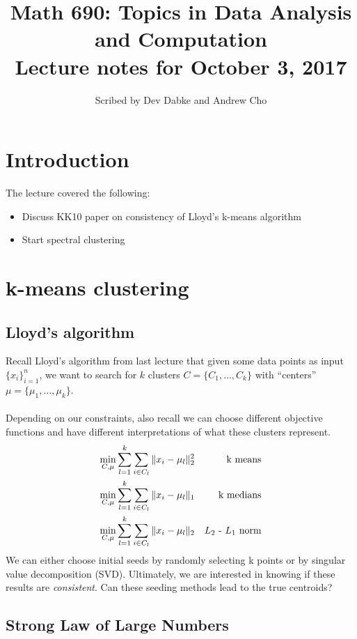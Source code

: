 \documentclass[12pt]{article}
\title{Math 690: Topics in Data Analysis and Computation \\
Lecture notes for October 3, 2017}
\date{}
\author{Scribed by Dev Dabke and Andrew Cho}
\theoremstyle{plain}
\begin{document}
\maketitle

\section{Introduction}
The lecture covered the following:
\begin{itemize}
	\item Discuss KK10 paper on consistency of Lloyd's k-means algorithm
	\item Start spectral clustering
\end{itemize}

\section{k-means clustering}
\label{sec:kmeans}

\subsection{Lloyd's algorithm}
\label{subsec: lloyd}

Recall Lloyd's algorithm from last lecture that given some data points as input $ \{ x_i \}^n_{i = 1} $, we want to search for $ k $ clusters $ C = \{ C_1, \ldots, C_k \} $ with ``centers'' $ \mu = \{ \mu_1, \ldots, \mu_k \} $.
\\ \\
Depending on our constraints, also recall we can choose different objective functions and have different interpretations of what these clusters represent.
\begin{align*}
  \min_{C, \mu} & \sum_{l = 1}^k \sum_{i \in C_{l}} \| x_i - \mu_{l} \|_2^2 & \text{k means} \\
  \min_{C, \mu} & \sum_{l = 1}^k \sum_{i \in C_{l}} \| x_i - \mu_{l} \|_{1} & \text{k medians} \\
  \min_{C, \mu} & \sum_{l = 1}^k \sum_{i \in C_{l}} \| x_i - \mu_{l} \|_2 & \text{$ L_2 $ - $ L_1 $ norm}
\end{align*}
We can either choose initial seeds by randomly selecting k points or by singular value decomposition (SVD). Ultimately, we are interested in knowing if these results are \textit{consistent}.
Can these seeding methods lead to the true centroids?

\subsection{Strong Law of Large Numbers}
\label{subsec:slln}
\end{document}
